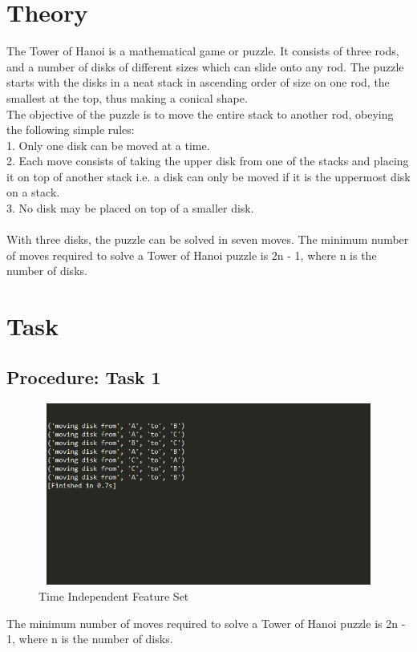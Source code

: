 \documentclass[11pt]{article}            %
\begin{document}
\section{Theory }              
The Tower of Hanoi is a mathematical game or puzzle. It consists of three rods, and a number of disks of different sizes which can slide onto any rod. The puzzle starts with the disks in a neat stack in ascending order of size on one rod, the smallest at the top, thus making a conical shape. \\
The objective of the puzzle is to move the entire stack to another rod, obeying the following simple rules:\\
1.	Only one disk can be moved at a time.\\
2.	Each move consists of taking the upper disk from one of the stacks and placing it on top of another stack i.e. a disk can only be moved if it is the uppermost disk on a stack.\\
3.	No disk may be placed on top of a smaller disk.\\ \\
With three disks, the puzzle can be solved in seven moves. 
The minimum number of moves required to solve a Tower of Hanoi puzzle is 2n - 1, where n is the number of disks.

\section{Task}  
\subsection{Procedure: Task 1 }     

\begin{figure}
\centering
  \includegraphics[width=12cm,height=6cm,keepaspectratio]{1.png}
\caption{Time Independent Feature Set}
\label{Figure:3}    
\end{figure}
The minimum number of moves required to solve a Tower of Hanoi puzzle is 2n - 1, where n is the number of disks.
\end{document}
